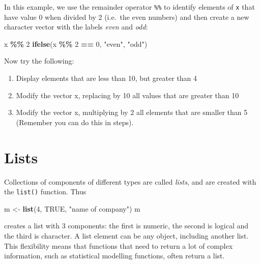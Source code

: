 \documentclass[
]{book}
\newenvironment{Shaded}{\begin{snugshade}}{\end{snugshade}}
\newcommand{\ConstantTok}[1]{\textcolor[rgb]{0.56,0.35,0.01}{#1}}
\newcommand{\DecValTok}[1]{\textcolor[rgb]{0.00,0.00,0.81}{#1}}
\newcommand{\FunctionTok}[1]{\textcolor[rgb]{0.13,0.29,0.53}{\textbf{#1}}}
\newcommand{\NormalTok}[1]{#1}
\newcommand{\OtherTok}[1]{\textcolor[rgb]{0.56,0.35,0.01}{#1}}
\newcommand{\SpecialCharTok}[1]{\textcolor[rgb]{0.81,0.36,0.00}{\textbf{#1}}}
\newcommand{\StringTok}[1]{\textcolor[rgb]{0.31,0.60,0.02}{#1}}
\providecommand{\tightlist}{%
  \setlength{\itemsep}{0pt}\setlength{\parskip}{0pt}}
\begin{document}
In this example, we use the remainder operator \texttt{\%\%} to identify
elements of \texttt{x} that have value 0 when divided by 2 (i.e.~the even numbers)
and then create a new character vector with the labels \emph{even} and \emph{odd}:

\begin{Shaded}
\begin{Highlighting}[]
\NormalTok{x }\SpecialCharTok{\%\%} \DecValTok{2}
\FunctionTok{ifelse}\NormalTok{(x }\SpecialCharTok{\%\%} \DecValTok{2} \SpecialCharTok{==} \DecValTok{0}\NormalTok{, }\StringTok{"even"}\NormalTok{, }\StringTok{"odd"}\NormalTok{)}
\end{Highlighting}
\end{Shaded}

Now try the following:

\begin{enumerate}
\def\labelenumi{\arabic{enumi}.}
\tightlist
\item
  Display elements that are less than 10, but greater than 4
\item
  Modify the vector x, replacing by 10 all values that are greater than 10
\item
  Modify the vector x, multiplying by 2 all elements that are smaller than 5 (Remember you can do this in steps).
\end{enumerate}

\section{Lists}\label{lists}

Collections of components of different types are called \emph{lists},
and are created with the \texttt{list()} function. Thus

\begin{Shaded}
\begin{Highlighting}[]
\NormalTok{m }\OtherTok{\textless{}{-}} \FunctionTok{list}\NormalTok{(}\DecValTok{4}\NormalTok{, }\ConstantTok{TRUE}\NormalTok{, }\StringTok{"name of company"}\NormalTok{)}
\NormalTok{m}
\end{Highlighting}
\end{Shaded}

creates a list with 3 components: the first is numeric, the second
is logical and the third is character. A list element can be any
object, including another list. This flexibility means that functions
that need to return a lot of complex information, such as statistical
modelling functions, often return a list.
\end{document}
